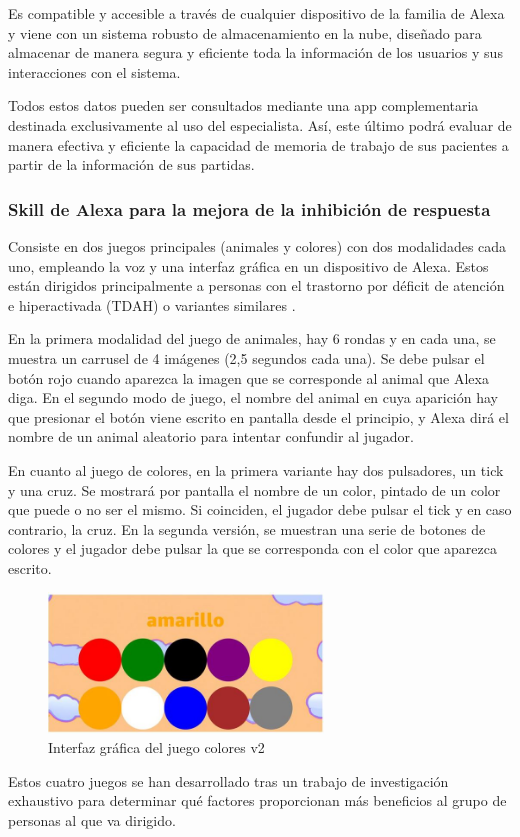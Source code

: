 Es compatible y accesible a través de cualquier dispositivo de la familia de Alexa y viene con un sistema robusto de almacenamiento en la nube, diseñado para almacenar de manera segura y eficiente toda la información de los usuarios y sus interacciones con el sistema.

Todos estos datos pueden ser consultados mediante una app complementaria destinada exclusivamente al uso del especialista. Así, este último podrá evaluar de manera efectiva y eficiente la capacidad de memoria de trabajo de sus pacientes a partir de la información de sus partidas.

\subsubsection{Skill de Alexa para la mejora de la inhibición de respuesta}

Consiste en dos juegos principales (animales y colores) con dos modalidades cada uno, empleando la voz y una interfaz gráfica en un dispositivo de Alexa. Estos están dirigidos principalmente a personas con el trastorno por déficit de atención e hiperactivada (TDAH) o variantes similares \parencite{tfgAlexa1}.

En la primera modalidad del juego de animales, hay 6 rondas y en cada una, se muestra un carrusel de 4 imágenes (2,5 segundos cada una). Se debe pulsar el botón rojo cuando aparezca la imagen que se corresponde al animal que Alexa diga. En el segundo modo de juego, el nombre del animal en cuya aparición hay que presionar el botón viene escrito en pantalla desde el principio, y Alexa dirá el nombre de un animal aleatorio para intentar confundir al jugador.

En cuanto al juego de colores, en la primera variante hay dos pulsadores, un tick y una cruz. Se mostrará por pantalla el nombre de un color, pintado de un color que puede o no ser el mismo. Si coinciden, el jugador debe pulsar el tick y en caso contrario, la cruz. En la segunda versión, se muestran una serie de botones de colores y el jugador debe pulsar la que se corresponda con el color que aparezca escrito.

\begin{figure}[ht]
    \centering
    \includegraphics[width=0.65\textwidth]{imgs/mockupTFG1.JPG}
    \caption{Interfaz gráfica del juego colores v2}
    \label{fig:mockupTFG1}
\end{figure}

Estos cuatro juegos se han desarrollado tras un trabajo de investigación exhaustivo para determinar qué factores proporcionan más beneficios al grupo de personas al que va dirigido.
